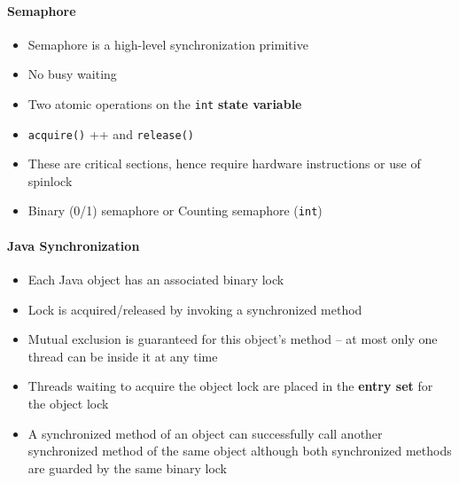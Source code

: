 \documentclass[a4paper]{article}
\begin{document}
\paragraph{Semaphore}
\begin{itemize}
	\item Semaphore is a high-level synchronization primitive
	\item No busy waiting
	\item Two atomic operations on the \texttt{int} \textbf{state variable}
	\item \texttt{acquire()} ++ and \texttt{release()}
	\item These are critical sections, hence require hardware instructions or use of spinlock
	\item Binary (0/1) semaphore or Counting semaphore (\texttt{int})
\end{itemize}
\paragraph{Java Synchronization}
\begin{itemize}
	\item Each Java object has an associated binary lock
	\item Lock is acquired/released by invoking a synchronized method
	\item Mutual exclusion is guaranteed for this object’s method – at most only one thread can be inside it at any time
	\item Threads waiting to acquire the object lock are placed in the \textbf{entry set} for the object lock
	\item A synchronized method of an object can successfully call another synchronized method of the same object although both synchronized methods are guarded by the same binary lock
\end{itemize}
\end{document}
